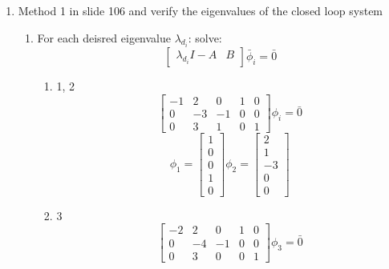   \begin{enumerate}
  \item Method 1 in slide 106 and verify the eigenvalues of the closed loop system \\
    \begin{enumerate}
    \item For each deisred eigenvalue $\lambda_{d_i}$: solve:
      \begin{equation}
        \begin{bmatrix}
          \lambda_{d_i}I - A & B
        \end{bmatrix}\bar \phi_i =
        \bar 0
      \end{equation}
      \begin{enumerate}
      \item 1, 2
        \begin{equation}
          \begin{bmatrix}
            -1 & 2 & 0 & 1 & 0\\
            0 & -3 & -1 & 0 & 0 \\
            0 & 3 & 1  & 0 & 1
          \end{bmatrix}\phi_i = \bar 0
        \end{equation}
        \begin{equation}
          \phi_1 =
          \begin{bmatrix}
            1 \\
            0 \\
            0 \\
            1 \\
            0 
          \end{bmatrix}
          \phi_2 =
          \begin{bmatrix}
            2 \\
            1 \\
            -3 \\
            0 \\
            0 
          \end{bmatrix}
        \end{equation}
      \item 3
        \begin{equation}
          \begin{bmatrix}
            -2 & 2 & 0 & 1 & 0\\
            0 & -4 & -1 & 0 & 0 \\
            0 & 3 & 0  & 0 & 1
          \end{bmatrix}\phi_3 = \bar 0

\end{equation}
\end{enumerate}
\end{enumerate}
\end{enumerate}
